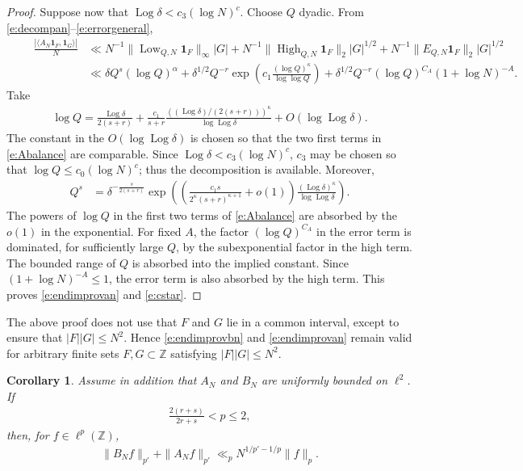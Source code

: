 \documentclass[12pt,reqno]{amsart}
\numberwithin{equation}{section}
\newtheorem{corollary}[equation]{Corollary}
\theoremstyle{definition}
\theoremstyle{remark}
\newcommand{\Log}{\operatorname{Log}}
\begin{document}
\begin{proof}
Suppose now that $\Log\delta<c_3(\log N)^c$.  Choose $Q$ dyadic.  From \eqref{e:decompan}--\eqref{e:errorgeneral},
\begin{align}\label{e:Abalance} \qquad
 \frac{|\langle A_N\mathbf1_F,\mathbf1_G\rangle|}{N} &\ll N^{-1}\|\operatorname{Low}_{Q,N}\mathbf1_F\|_\infty |G|   +N^{-1}\|\operatorname{High}_{Q,N}\mathbf1_F\|_2  |G|^{1/2} + N^{-1} \|E_{Q,N}\mathbf1_F\|_2 |G|^{1/2}\\
 &\ll \delta Q^s(\log Q)^\alpha
 +\delta^{1/2}Q^{-r}\exp\left(c_1\frac{(\log Q)^\kappa}{\log\log Q}\right)
 +\delta^{1/2}Q^{-r}(\log Q)^{C_A}
 (1+\log N)^{-A}.
\end{align}
Take
\begin{align}\label{e:Qchoice}
 \log Q=\frac{\Log \delta}{2(s+r)}+
 \frac{c_1}{s+r}\frac{\left((\Log \delta)/(2(s+r))\right)^\kappa}{\log \Log \delta}+O(\log \Log \delta).
\end{align}
The constant in the $O(\log \Log \delta)$ is chosen so that the two first terms
in \eqref{e:Abalance} are comparable.  Since $\Log \delta<c_3(\log N)^c$,
$c_3$ may be chosen so that $\log Q\leq c_0(\log N)^c$; thus the
decomposition is available.  Moreover,
\begin{align*}
 Q^s
 &=\delta^{-\frac{s}{2(s+r)}}
 \exp\left(\left(\frac{c_1s}{2^\kappa(s+r)^{\kappa+1}}+o(1)\right)
 \frac{(\Log \delta)^\kappa}{\log \Log \delta}\right).
\end{align*}
The powers of \(\log Q\) in the first two terms of
\eqref{e:Abalance} are absorbed by the \(o(1)\) in the exponential.  For
fixed \(A\), the factor \((\log Q)^{C_A}\) in the error term is dominated,
for sufficiently large \(Q\), by the subexponential factor in the high
term.  The bounded range of \(Q\) is absorbed into the implied constant.
Since \((1+\log N)^{-A}\leq1\), the error term is also absorbed by the
high term.  This proves \eqref{e:endimprovan} and \eqref{e:cstar}.
\end{proof}

The above proof does not use that $F$ and $G$ lie in a common interval,
except to ensure that $|F||G|\leq N^2$.  Hence
\eqref{e:endimprovbn} and \eqref{e:endimprovan} remain valid for
arbitrary finite sets $F,G\subset\mathbb Z$ satisfying
$|F||G|\leq N^2$.

\begin{corollary}\label{c:improvinggeneral}
Assume in addition that $A_N$ and $B_N$ are uniformly bounded on
$\ell^2$.  If
\begin{align*}
 \frac{2(r+s)}{2r+s}<p\leq2,
\end{align*}
then, for $f\in \ell^p(\mathbb{Z})$,
\begin{align}
 \|B_Nf\|_{p'}+\|A_Nf\|_{p'}
 \ll_p N^{1/p'-1/p}\|f\|_p.\label{e:lpimproving}
\end{align}
\end{corollary}
\end{document}
